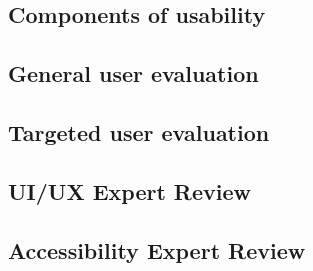 \subsection{Components of usability}


\newpage
\subsection{General user evaluation}


\newpage
\subsection{Targeted user evaluation}


\newpage
\subsection{UI/UX Expert Review}


\newpage
\subsection{Accessibility Expert Review}
